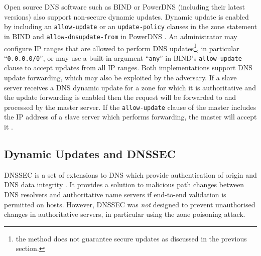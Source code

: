 Open source DNS software such as BIND or PowerDNS (including their latest versions) also support non-secure dynamic updates. 
Dynamic update is enabled by including an \texttt{allow-update} or an \texttt{update-policy} 
clauses in the zone statement in BIND \cite{bindman} and \texttt{allow-dnsupdate-from} in PowerDNS \cite{powerman}.
An administrator may configure IP ranges that are allowed to perform DNS updates\footnote{the method does not guarantee secure updates as discussed in the previous section.}, in particular ``\texttt{0.0.0.0/0}'', or may use a built-in argument ``\texttt{any}'' in BIND's \texttt{allow-update} clause  to accept updates from all IP ranges.
Both implementations support DNS update forwarding, which may also be exploited by the adversary.
If a slave server receives a DNS dynamic update for a zone for which it is authoritative and the update forwarding is enabled then the request will be forwarded to and processed by the master server.
If the \texttt{allow-update} clause of the master includes the IP address of a slave server which performs forwarding, the master will accept it \cite{bindman}.

\subsection{Dynamic Updates and DNSSEC}
DNSSEC is a set of extensions to DNS which provide %
authentication of origin and DNS data integrity \cite{rfc4033}.
It provides a solution to malicious path changes between DNS resolvers and authoritative name servers if end-to-end validation is permitted on hosts.
However, DNSSEC was \textit{not} designed to prevent unauthorised changes in authoritative  servers, in particular using the zone poisoning attack.

